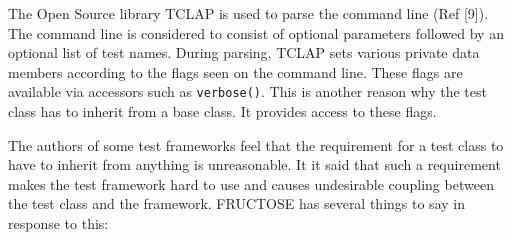 \documentclass{book}
\begin{document}
The Open Source library TCLAP is used to parse the command line (Ref [9]).
The command line is considered to consist of optional parameters
followed by an optional list of test names.
During parsing, TCLAP sets various private data members according to the
flags seen on the command line. These flags are available via accessors
such as {\tt verbose()}. This is another reason why the test class has
to inherit from a base class. It provides access to these flags.


The authors of some test frameworks feel that the requirement
for a test class to have to inherit from anything is unreasonable.
It it said that such a requirement makes the test framework hard to use
and causes undesirable coupling between the test class and the framework.
FRUCTOSE has several things to say in response to this:
\end{document}
